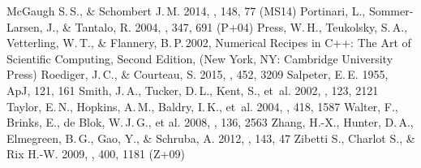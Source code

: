 \documentclass[12pt]{emulateapj}
\begin{document}
\begin{thebibliography}{}
 McGaugh S.\,S., \& Schombert J.\,M. 2014, \aj, 148, 77 (MS14)
 Portinari, L., Sommer-Larsen, J., \& Tantalo, R. 2004, \mnras, 347, 691 (P+04)
 Press, W.\,H., Teukolsky, S.\,A., Vetterling, W.\,T., \& Flannery, B.\,P.\,2002, Numerical Recipes in C++: The Art of Scientific Computing, Second Edition, (New York, NY: Cambridge University Press)
 Roediger, J.\,C., \& Courteau, S. 2015, \mnras, 452, 3209
 Salpeter, E.\,E. 1955, ApJ, 121, 161
 Smith, J.\,A., Tucker, D.\,L., Kent, S., et~al. 2002, \aj, 123, 2121
 Taylor, E.\,N., Hopkins, A.\,M., Baldry, I.\,K., et~al. 2004, \mnras, 418, 1587
 Walter, F., Brinks, E., de Blok, W.\,J.\,G., et al. 2008, \aj, 136, 2563
 Zhang, H.-X., Hunter, D.\,A., Elmegreen, B.\,G., Gao, Y., \& Schruba, A. 2012, \aj, 143, 47
 Zibetti S., Charlot S., \& Rix H.-W. 2009, \mnras, 400, 1181 (Z+09)
\end{thebibliography}
\end{document}
